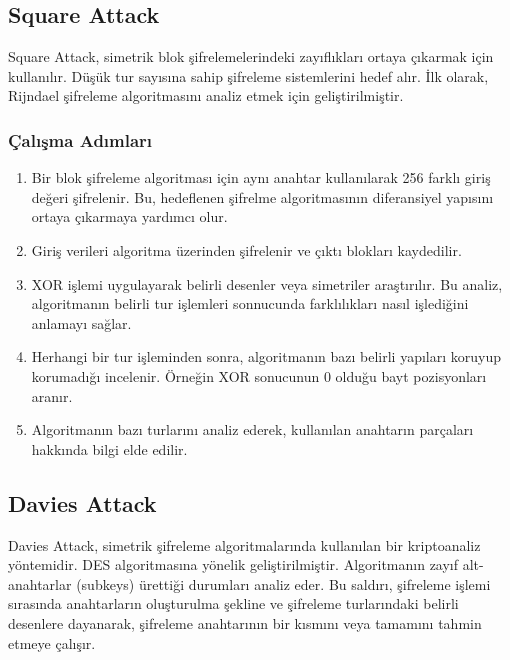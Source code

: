 \newpage

\subsection{Square Attack}

Square Attack, simetrik blok şifrelemelerindeki zayıflıkları ortaya çıkarmak için kullanılır. Düşük tur sayısına sahip şifreleme sistemlerini hedef alır. İlk olarak, Rijndael şifreleme algoritmasını analiz etmek için geliştirilmiştir.

\subsubsection{Çalışma Adımları}

\begin{enumerate}
    \item Bir blok şifreleme algoritması için aynı anahtar kullanılarak 256 farklı giriş değeri şifrelenir. Bu, hedeflenen şifrelme algoritmasının diferansiyel yapısını ortaya çıkarmaya yardımcı olur.
    \item Giriş verileri algoritma üzerinden şifrelenir ve çıktı blokları kaydedilir.
    \item XOR işlemi uygulayarak belirli desenler veya simetriler araştırılır. Bu analiz, algoritmanın belirli tur işlemleri sonnucunda farklılıkları nasıl işlediğini anlamayı sağlar.
    \item Herhangi bir tur işleminden sonra, algoritmanın bazı belirli yapıları koruyup korumadığı incelenir. Örneğin XOR sonucunun 0 olduğu bayt pozisyonları aranır.
    \item Algoritmanın bazı turlarını analiz ederek, kullanılan anahtarın parçaları hakkında bilgi elde edilir.
\end{enumerate}

\newpage

\subsection{Davies Attack}

Davies Attack, simetrik şifreleme algoritmalarında kullanılan bir kriptoanaliz yöntemidir. DES algoritmasına yönelik geliştirilmiştir. Algoritmanın zayıf alt-anahtarlar (subkeys) ürettiği durumları analiz eder. Bu saldırı, şifreleme işlemi sırasında anahtarların oluşturulma şekline ve şifreleme turlarındaki belirli desenlere dayanarak, şifreleme anahtarının bir kısmını veya tamamını tahmin etmeye çalışır.

